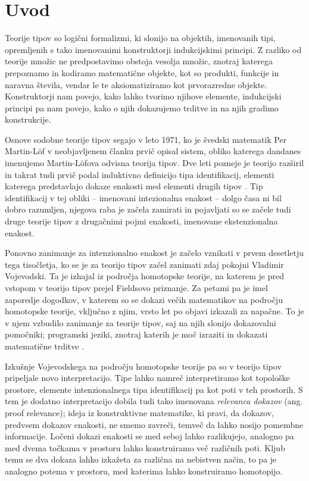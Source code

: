 \section{Uvod}

Teorije tipov so logični formalizmi, ki slonijo na objektih, imenovanih tipi, opremljenih s tako imenovanimi konstruktorji indukcijskimi principi. Z razliko od teorije množic ne predpostavimo obstoja vesolja množic, znotraj katerega prepoznamo in kodiramo matematične objekte, kot so produkti, funkcije in naravna števila, vendar le te aksiomatiziramo kot prvorazredne objekte. Konstruktorji nam povejo, kako lahko tvorimo njihove elemente, indukcijski principi pa nam povejo, kako o njih dokazujemo trditve in na njih gradimo konstrukcije.

Osnove sodobne teorije tipov segajo v leto 1971, ko je švedski matematik Per Martin-Löf v neobjavljenem članku prvič opisal sistem, obliko katerega dandanes imenujemo Martin-Löfova odvisna teorija tipov. Dve leti pozneje je teorijo razširil in takrat tudi prvič podal induktivno definicijo tipa identifikacij, elementi katerega predstavlajo dokaze enakosti med elementi drugih tipov \cite{Martin-Lof-1973}. Tip identifikacij v tej obliki -- imenovani intezionalna enakost -- dolgo časa ni bil dobro razumljen, njegova raba je začela zamirati in pojavljati so se začele tudi druge teorije tipov z drugačnimi pojmi enakosti, imenovane ekstenzionalna enakost.

Ponovno zanimanje za intenzionalno enakost je začelo vznikati v prvem desetletju tega tisočletja, ko se je za teorijo tipov začel zanimati zdaj pokojni Vladimir Vojevodski. Ta je izhajal iz področja homotopske teorije, na katerem je pred vstopom v teorijo tipov prejel Fieldsovo priznanje. Za petami pa je imel zaporedje dogodkov, v katerem so se dokazi večih matematikov na področju homotopske teorije, vključno z njim, vrsto let po objavi izkazali za napačne. To je v njem vzbudilo zanimanje za teorije tipov, saj na njih slonijo dokazovalni pomočniki; programski jeziki, znotraj katerih je moč izraziti in dokazati matematične trditve \cite{origin-of-uni-foundations}.

Izkušnje Vojevodskega na področju homotopske teorije pa so v teorijo tipov pripeljale novo interpretacijo. Tipe lahko namreč interpretiramo kot topološke prostore, elemente intenzionalnega tipa identifikacij pa kot poti v teh prostorih. S tem je dodatno interpretacijo dobila tudi tako imenovana \emph{relevanca dokazov} (ang. proof relevance); ideja iz konstruktivne matematike, ki pravi, da dokazov, predvsem dokazov enakosti, ne smemo zavreči, temveč da lahko nosijo pomembne informacije. Ločeni dokazi enakosti se med seboj lahko razlikujejo, analogno pa med dvema točkama v prostoru lahko konstruiramo več različnih poti. Kljub temu se dva dokaza lahko izkažeta za različna na nebistven način, to pa je analogno potema v prostoru, med katerima lahko konstruiramo homotopijo.

